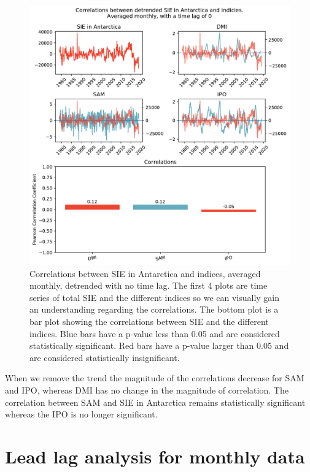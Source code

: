 \begin{figure}[H]
    \centering
    \includegraphics[width = \linewidth]{Images_3.0/correlations/subplots_indicies_monthly_0_anomalous_detrended.pdf}
    \caption[Correlations between SIE in Antarctica and indices, averaged monthly, detrended with no time lag.]{Correlations between SIE in Antarctica and indices, averaged monthly, detrended with no time lag. The first 4 plots are time series of total SIE and the different indices so we can visually gain an understanding regarding the correlations. The bottom plot is a bar plot showing the correlations between SIE and the different indices. Blue bars have a p-value less than 0.05 and are considered statistically significant. Red bars have a p-value larger than 0.05 and are considered statistically insignificant.}
    \label{fig:seasonal_without_trend}
\end{figure}

When we remove the trend the magnitude of the correlations decrease for SAM and IPO, whereas DMI has no change in the magnitude of correlation. The correlation between SAM and SIE in Antarctica remains statistically significant whereas the IPO is no longer significant. 


\section{Lead lag analysis for monthly data}

